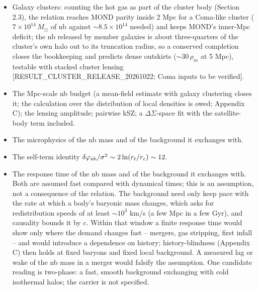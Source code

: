 \documentclass[
  10pt,
]{article}
\begin{document}
\begin{itemize}
\item Galaxy clusters: counting the hot gas as part of the cluster body (Section 2.3), the relation reaches MOND parity inside 2 Mpc for a Coma-like cluster ($7\times10^{14}\,M_\odot$ of nb against $\sim8.5\times10^{14}$ needed) and keeps MOND's inner-Mpc deficit; the nb released by member galaxies is about three-quarters of the cluster's own halo out to its truncation radius, so a conserved completion closes the bookkeeping and predicts dense outskirts ($\sim30\,\rho_m$ at 5 Mpc), testable with stacked cluster lensing {[}RESULT\_CLUSTER\_RELEASE\_20261022; Coma inputs to be verified{]}.
\item The Mpc-scale nb budget (a mean-field estimate with galaxy clustering closes it; the calculation over the distribution of local densities is owed; Appendix C); the lensing amplitude; pairwise kSZ; a $\Delta\Sigma$-space fit with the satellite-body term included.
\item The microphysics of the nb mass and of the background it exchanges with.
\item The self-term identity $\delta\varphi_{\rm nb}/\sigma^2\sim 2\ln(r_t/r_c)\sim 12$.
\item The response time of the nb mass and of the background it exchanges with. Both are assumed fast compared with dynamical times; this is an assumption, not a consequence of the relation. The background need only keep pace with the rate at which a body's baryonic mass changes, which asks for redistribution speeds of at least $\sim10^3$ km/s (a few Mpc in a few Gyr), and causality bounds it by $c$. Within that window a finite response time would show only where the demand changes fast -- mergers, gas stripping, first infall -- and would introduce a dependence on history; history-blindness (Appendix C) then holds at fixed baryons and fixed local background. A measured lag or wake of the nb mass in a merger would falsify the assumption. One candidate reading is two-phase: a fast, smooth background exchanging with cold isothermal halos; the carrier is not specified.

\end{itemize}
\end{document}
